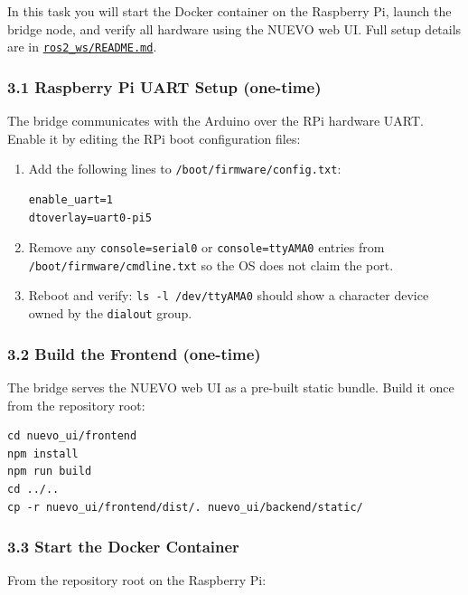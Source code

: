 \documentclass{ol-softwaremanual}
\newcommand{\doclink}[2]{\href{#1}{#2}}
\begin{document}
In this task you will start the Docker container on the Raspberry Pi, launch the
bridge node, and verify all hardware using the NUEVO web UI.
Full setup details are in
\doclink{https://github.com/pochihh/Project-NUEVO/blob/main/ros2_ws/README.md}{\texttt{ros2\_ws/README.md}}.

\subsubsection*{3.1 Raspberry Pi UART Setup (one-time)}

The bridge communicates with the Arduino over the RPi hardware UART.
Enable it by editing the RPi boot configuration files:

\begin{enumerate}
  \item Add the following lines to \texttt{/boot/firmware/config.txt}:
\begin{verbatim}
enable_uart=1
dtoverlay=uart0-pi5
\end{verbatim}

  \item Remove any \texttt{console=serial0} or \texttt{console=ttyAMA0} entries
        from \texttt{/boot/firmware/cmdline.txt} so the OS does not claim the port.

  \item Reboot and verify: \texttt{ls -l /dev/ttyAMA0} should show a character
        device owned by the \texttt{dialout} group.
\end{enumerate}

\subsubsection*{3.2 Build the Frontend (one-time)}

The bridge serves the NUEVO web UI as a pre-built static bundle.
Build it once from the repository root:

\begin{verbatim}
cd nuevo_ui/frontend
npm install
npm run build
cd ../..
cp -r nuevo_ui/frontend/dist/. nuevo_ui/backend/static/
\end{verbatim}

\subsubsection*{3.3 Start the Docker Container}

From the repository root on the Raspberry Pi:
\end{document}
